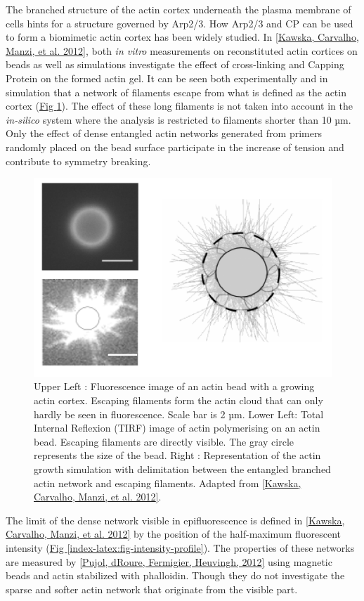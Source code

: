 \documentclass[A4paperpaper,11pt,english]{sphinxmanual}
\begin{document}
The branched structure of the actin cortex underneath the plasma membrane of
cells hints for a structure governed by Arp2/3. How Arp2/3 and CP can be used
to form a biomimetic actin cortex has been widely studied. In
{\hyperref[index-latex:kawska2012]{{[}Kawska, Carvalho, Manzi,  et al.  2012{]}}}, both \emph{in vitro} measurements on reconstituted actin cortices
on beads as well as simulations investigate the effect of cross-linking and
Capping Protein on the formed actin gel. It can be seen both experimentally and in
simulation that a network of filaments escape from what is defined as the actin
cortex (\hyperref[index-latex:fig-bead-tirf]{Fig  \ref*{index-latex:fig-bead-tirf}}). The effect of these long filaments is not taken into account in the
\emph{in-silico} system where the analysis is restricted to filaments shorter than 10
µm. Only the effect of dense entangled actin networks generated from primers
randomly placed  on the bead surface participate in the increase of tension and
contribute to symmetry breaking.
\begin{figure}[htbp]
\centering
\capstart

\includegraphics[width=0.700\linewidth]{Bead-tirf-fluo-sim.png}
\caption{Upper Left : Fluorescence image of an actin bead with a growing actin
cortex. Escaping filaments form the actin cloud that can only hardly  be
seen in fluorescence. Scale bar is 2 µm. Lower Left: Total Internal Reflexion (TIRF) image
of actin polymerising on an actin bead. Escaping filaments are directly
visible. The gray circle represents the size of the bead.  Right :
Representation of the actin growth simulation with delimitation between the
entangled branched actin network and escaping filaments.  Adapted from
{\hyperref[index-latex:kawska2012]{{[}Kawska, Carvalho, Manzi,  et al.  2012{]}}}.}\label{index-latex:fig-bead-tirf}\end{figure}

The limit of the dense network visible in epifluorescence is defined in
{\hyperref[index-latex:kawska2012]{{[}Kawska, Carvalho, Manzi,  et al.  2012{]}}} by the position of the half-maximum fluorescent intensity (\hyperref[index-latex:fig-intensity-profile]{Fig  \ref*{index-latex:fig-intensity-profile}}).
The properties of these networks are measured by {\hyperref[index-latex:pujol2012]{{[}Pujol, dRoure, Fermigier, Heuvingh,  2012{]}}} using
magnetic beads and actin stabilized with phalloidin. Though they do not
investigate the sparse and softer actin network that originate from the visible
part.
\end{document}
